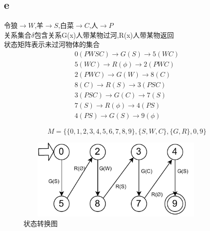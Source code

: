 \documentclass{article}
\begin{document}
\subsection*{e}
\begin{minipage}[h]{0.7\linewidth}
    \begin{flushleft}
        令狼$\rightarrow W$,羊$\rightarrow S$,白菜$\rightarrow C$,人$\rightarrow P$ \\
        关系集合$\delta$包含关系G(x)人带某物过河,R(x)人带某物返回\\
        状态矩阵表示未过河物体的集合\\
        \begin{align}
            0(PWSC)\rightarrow G(S)\rightarrow 5(WC)   \\
            5(WC)\rightarrow R(\phi)\rightarrow 2(PWC) \\
            2(PWC)\rightarrow G(W)\rightarrow 8(C)     \\
            8(C)\rightarrow R(S)\rightarrow 3(PSC)     \\
            3(PSC)\rightarrow G(C)\rightarrow 7(S)     \\
            7(S)\rightarrow R(\phi)\rightarrow 4(PS)   \\
            4(PS)\rightarrow G(S)\rightarrow 9(\phi)
        \end{align}
    \end{flushleft}
\end{minipage}
\hfill
\begin{minipage}[h]{0.3\linewidth}
    \begin{flushright}
    \end{flushright}
\end{minipage}
$$M=\{\{0,1,2,3,4,5,6,7,8,9\},\{S,W,C\},\{G,R\},0,9\}$$
\begin{figure}[ht]
    \centering
    \includegraphics[width=10cm,height=4cm]{3.pdf}
    \caption{状态转换图}
\end{figure}
\end{document}
